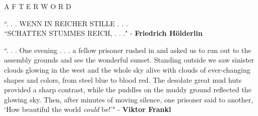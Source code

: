 \documentclass[12pt]{article}
\begin{document}

\begingroup
\begin{center}
\huge A F T E R W O R D
\end{center}
\endgroup

\vspace{8\baselineskip}

\begingroup
``. . . WENN IN REICHER STILLE . . . \\
``SCHATTEN STUMMES REICH, . . ."
\phantom{text} \hfill - \textbf{Friedrich Hölderlin}
\endgroup

\vspace{2\baselineskip}

\begingroup
``. . . One evening . . . a fellow prisoner rushed in and asked us to run out to the assembly grounds and see the wonderful sunset. Standing outside we saw sinister clouds glowing in the west and the whole sky alive with clouds of ever-changing shapes and colors, from steel blue to blood red. The desolate great mud huts provided a sharp contrast, while the puddles on the muddy ground reflected the glowing sky. Then, after minutes of moving silence, one prisoner said to another, `How beautiful the world \textit{could} be!'"
\phantom{text} \hfill - \textbf{Viktor Frankl}
\endgroup
\end{document}
